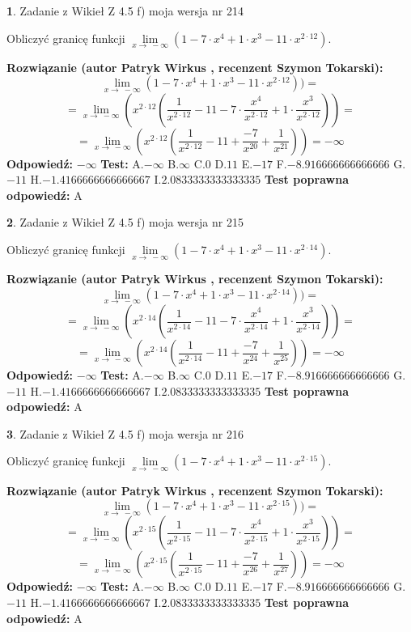 \documentclass[12pt, a4paper]{article}
\theoremstyle{definition} %
\newtheorem{zad}{}
\newcommand{\zadStart}[1]{\begin{zad}#1\newline}
\newcommand{\zadStop}{\end{zad}}
\newcommand{\rozwStart}[2]{\noindent \textbf{Rozwiązanie (autor #1 , recenzent #2): }\newline}
\newcommand{\rozwStop}{\newline}
\newcommand{\odpStart}{\noindent \textbf{Odpowiedź:}\newline}
\newcommand{\odpStop}{\newline}
\newcommand{\testStart}{\noindent \textbf{Test:}\newline}
\newcommand{\testStop}{\newline}
\newcommand{\kluczStart}{\noindent \textbf{Test poprawna odpowiedź:}\newline}
\newcommand{\kluczStop}{\newline}
\begin{document}
\zadStart{Zadanie z Wikieł Z 4.5 f) moja wersja nr 214}


Obliczyć granicę funkcji  $\lim\limits_{x\to\ -\infty}(1 - 7 \cdot x^{4}+1 \cdot x^{3}- 11 \cdot x^{2\cdot12})$.
\zadStop
\rozwStart{Patryk Wirkus}{Szymon Tokarski}
$$\lim\limits_{x\to\ -\infty}(1 - 7 \cdot x^{4}+1 \cdot x^{3}- 11 \cdot x^{2\cdot12}))=$$
$$=\lim\limits_{x\to\ -\infty}(x^{2\cdot12}(\frac{1}{x^{2\cdot12}}-11 -7 \cdot \frac{x^{4}}{x^{2\cdot12}}+1 \cdot \frac{x^{3}}{x^{2\cdot12}}))=$$
$$=\lim\limits_{x\to\ -\infty}(x^{2\cdot12}(\frac{1}{x^{2\cdot12}}-11 + \frac{-7}{x^{20}}+ \frac{1}{x^{21}}))=-\infty$$
\rozwStop
\odpStart
$-\infty$
\odpStop
\testStart
A.$-\infty$ B.$\infty$ C.$0$ D.$11$ E.$-17$
F.$-8.916666666666666$ G.$-11$
H.$-1.4166666666666667$
I.$2.0833333333333335$
\testStop
\kluczStart
A
\kluczStop



\zadStart{Zadanie z Wikieł Z 4.5 f) moja wersja nr 215}


Obliczyć granicę funkcji  $\lim\limits_{x\to\ -\infty}(1 - 7 \cdot x^{4}+1 \cdot x^{3}- 11 \cdot x^{2\cdot14})$.
\zadStop
\rozwStart{Patryk Wirkus}{Szymon Tokarski}
$$\lim\limits_{x\to\ -\infty}(1 - 7 \cdot x^{4}+1 \cdot x^{3}- 11 \cdot x^{2\cdot14}))=$$
$$=\lim\limits_{x\to\ -\infty}(x^{2\cdot14}(\frac{1}{x^{2\cdot14}}-11 -7 \cdot \frac{x^{4}}{x^{2\cdot14}}+1 \cdot \frac{x^{3}}{x^{2\cdot14}}))=$$
$$=\lim\limits_{x\to\ -\infty}(x^{2\cdot14}(\frac{1}{x^{2\cdot14}}-11 + \frac{-7}{x^{24}}+ \frac{1}{x^{25}}))=-\infty$$
\rozwStop
\odpStart
$-\infty$
\odpStop
\testStart
A.$-\infty$ B.$\infty$ C.$0$ D.$11$ E.$-17$
F.$-8.916666666666666$ G.$-11$
H.$-1.4166666666666667$
I.$2.0833333333333335$
\testStop
\kluczStart
A
\kluczStop



\zadStart{Zadanie z Wikieł Z 4.5 f) moja wersja nr 216}


Obliczyć granicę funkcji  $\lim\limits_{x\to\ -\infty}(1 - 7 \cdot x^{4}+1 \cdot x^{3}- 11 \cdot x^{2\cdot15})$.
\zadStop
\rozwStart{Patryk Wirkus}{Szymon Tokarski}
$$\lim\limits_{x\to\ -\infty}(1 - 7 \cdot x^{4}+1 \cdot x^{3}- 11 \cdot x^{2\cdot15}))=$$
$$=\lim\limits_{x\to\ -\infty}(x^{2\cdot15}(\frac{1}{x^{2\cdot15}}-11 -7 \cdot \frac{x^{4}}{x^{2\cdot15}}+1 \cdot \frac{x^{3}}{x^{2\cdot15}}))=$$
$$=\lim\limits_{x\to\ -\infty}(x^{2\cdot15}(\frac{1}{x^{2\cdot15}}-11 + \frac{-7}{x^{26}}+ \frac{1}{x^{27}}))=-\infty$$
\rozwStop
\odpStart
$-\infty$
\odpStop
\testStart
A.$-\infty$ B.$\infty$ C.$0$ D.$11$ E.$-17$
F.$-8.916666666666666$ G.$-11$
H.$-1.4166666666666667$
I.$2.0833333333333335$
\testStop
\kluczStart
A
\kluczStop
\end{document}
